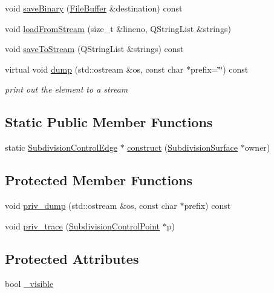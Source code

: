 \begin{DoxyCompactItemize}
void \hyperlink{classShipCAD_1_1SubdivisionControlEdge_a3106b0bc2a14884fd5d9b007902e5bf4}{save\+Binary} (\hyperlink{classShipCAD_1_1FileBuffer}{File\+Buffer} \&destination) const 
\item 
void \hyperlink{classShipCAD_1_1SubdivisionControlEdge_a318bf4102460ba91fd9e79fbde265ee3}{load\+From\+Stream} (size\+\_\+t \&lineno, Q\+String\+List \&strings)
\item 
void \hyperlink{classShipCAD_1_1SubdivisionControlEdge_ac8a11fbfcd6228c03e46768adeff760e}{save\+To\+Stream} (Q\+String\+List \&strings) const 
\item 
virtual void \hyperlink{classShipCAD_1_1SubdivisionControlEdge_abdfa96ff05eff404214a92d38d7eb715}{dump} (std\+::ostream \&os, const char $\ast$prefix=\char`\"{}\char`\"{}) const 
\begin{DoxyCompactList}\small\item\em print out the element to a stream \end{DoxyCompactList}\end{DoxyCompactItemize}
\subsection*{Static Public Member Functions}
\begin{DoxyCompactItemize}
\item 
static \hyperlink{classShipCAD_1_1SubdivisionControlEdge}{Subdivision\+Control\+Edge} $\ast$ \hyperlink{classShipCAD_1_1SubdivisionControlEdge_a20fc507b201766b6e3d0560595946fac}{construct} (\hyperlink{classShipCAD_1_1SubdivisionSurface}{Subdivision\+Surface} $\ast$owner)
\end{DoxyCompactItemize}
\subsection*{Protected Member Functions}
\begin{DoxyCompactItemize}
\item 
void \hyperlink{classShipCAD_1_1SubdivisionControlEdge_acc4cee57db50beb1dcc6361f7f2c62af}{priv\+\_\+dump} (std\+::ostream \&os, const char $\ast$prefix) const 
\item 
void \hyperlink{classShipCAD_1_1SubdivisionControlEdge_aec6ff8caa6996ae5a9d2e58d5d2b0344}{priv\+\_\+trace} (\hyperlink{classShipCAD_1_1SubdivisionControlPoint}{Subdivision\+Control\+Point} $\ast$p)
\end{DoxyCompactItemize}
\subsection*{Protected Attributes}
\begin{DoxyCompactItemize}
\item 
bool \hyperlink{classShipCAD_1_1SubdivisionControlEdge_a8d49343e2b6ff0ab13653849af242740}{\+\_\+visible}
\end{DoxyCompactItemize}


